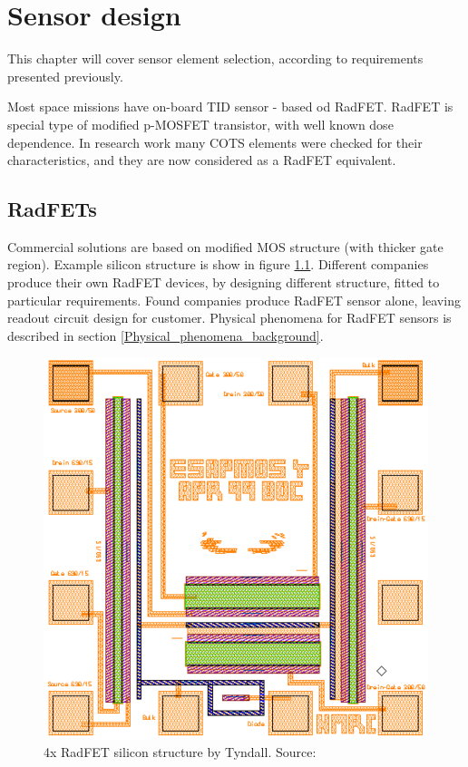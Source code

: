 \chapter{Sensor design}
This chapter will cover sensor element selection, according to requirements presented previously.

Most space missions have on-board TID sensor - based od RadFET. RadFET is special type of modified p-MOSFET transistor, with well known dose dependence. In research work many COTS elements were checked for their characteristics, and they are now considered as a RadFET equivalent.

\section{RadFETs}
    Commercial solutions are based on modified MOS structure (with thicker gate region). Example silicon structure is show in figure \ref{Tyndall_radfet_silicon}. Different companies produce their own RadFET devices, by designing different structure, fitted to particular requirements. Found companies produce RadFET sensor alone, leaving readout circuit design for customer. Physical phenomena for RadFET sensors is described in section \ref{Physical_phenomena_background}.

    \begin{figure}[H]
        \centering
        \includegraphics[width=0.5\paperwidth]{img/radfet-silicon.eps}
        \caption{4x RadFET silicon structure by Tyndall. Source: \cite{Tyndall_Radfet}}
        \label{Tyndall_radfet_silicon}
    \end{figure}


